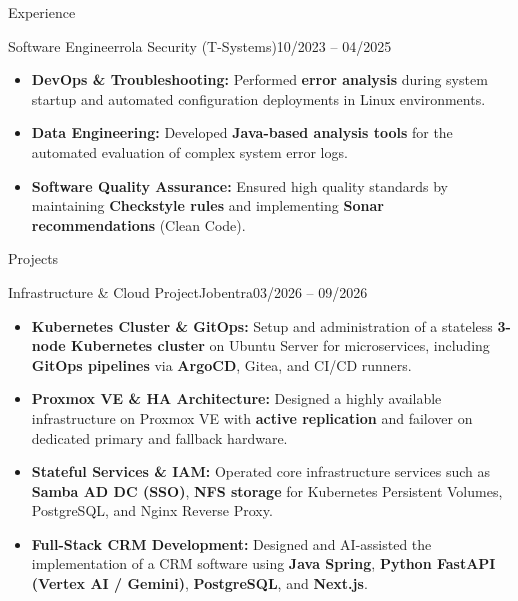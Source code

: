 \documentclass[]{mcdowellcv}
\begin{document}
\begin{cvsection}{Experience}
        \begin{cvsubsection}{Software Engineer}{rola Security (T-Systems)}{10/2023 -- 04/2025}
            \begin{itemize}
                \item \textbf{DevOps \& Troubleshooting:} Performed \textbf{error analysis} during system startup and automated configuration deployments in Linux environments.
                \item \textbf{Data Engineering:} Developed \textbf{Java-based analysis tools} for the automated evaluation of complex system error logs.
                \item \textbf{Software Quality Assurance:} Ensured high quality standards by maintaining \textbf{Checkstyle rules} and implementing \textbf{Sonar recommendations} (Clean Code).
            \end{itemize}
        \end{cvsubsection}
    \end{cvsection}

    \vspace{0.2cm}

    \begin{cvsection}{Projects}
        \begin{cvsubsection}{Infrastructure \& Cloud Project}{Jobentra}{03/2026 -- 09/2026}
            \begin{itemize}
                \item \textbf{Kubernetes Cluster \& GitOps:} Setup and administration of a stateless \textbf{3-node Kubernetes cluster} on Ubuntu Server for microservices, including \textbf{GitOps pipelines} via \textbf{ArgoCD}, Gitea, and CI/CD runners.
                \item \textbf{Proxmox VE \& HA Architecture:} Designed a highly available infrastructure on Proxmox VE with \textbf{active replication} and failover on dedicated primary and fallback hardware.
                \item \textbf{Stateful Services \& IAM:} Operated core infrastructure services such as \textbf{Samba AD DC (SSO)}, \textbf{NFS storage} for Kubernetes Persistent Volumes, PostgreSQL, and Nginx Reverse Proxy.
                \item \textbf{Full-Stack CRM Development:} Designed and AI-assisted the implementation of a CRM software using \textbf{Java Spring}, \textbf{Python FastAPI (Vertex AI / Gemini)}, \textbf{PostgreSQL}, and \textbf{Next.js}.
            \end{itemize}
        \end{cvsubsection}
    \end{cvsection}
\end{document}
